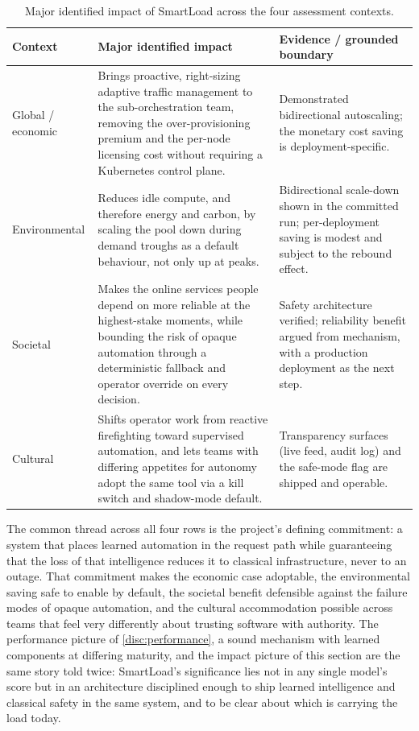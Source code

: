 \begin{table}[H]
  \centering
  \caption[Major identified impact across the four contexts]{Major identified impact of SmartLoad across the four assessment contexts.}
  \label{tab:disc:contexts}
  \small
  \begin{tabularx}{\linewidth}{@{}p{2.4cm}Yp{3.7cm}@{}}
    \toprule
    \headrow
    \textbf{Context} & \textbf{Major identified impact} & \textbf{Evidence / grounded boundary} \\
    \midrule
    Global / economic
      & Brings proactive, right-sizing adaptive traffic management to the
        sub-orchestration team, removing the over-provisioning premium and the
        per-node licensing cost without requiring a Kubernetes control plane.
      & Demonstrated bidirectional autoscaling; the monetary cost saving is
        deployment-specific. \\[2pt]
    Environmental
      & Reduces idle compute, and therefore energy and carbon, by scaling the
        pool down during demand troughs as a default behaviour, not only up at peaks.
      & Bidirectional scale-down shown in the committed run; per-deployment saving
        is modest and subject to the rebound effect. \\[2pt]
    Societal
      & Makes the online services people depend on more reliable at the highest-stake
        moments, while bounding the risk of opaque automation through a deterministic
        fallback and operator override on every decision.
      & Safety architecture verified; reliability benefit argued from mechanism, with
        a production deployment as the next step. \\[2pt]
    Cultural
      & Shifts operator work from reactive firefighting toward supervised automation,
        and lets teams with differing appetites for autonomy adopt the same tool via a
        kill switch and shadow-mode default.
      & Transparency surfaces (live feed, audit log) and the safe-mode flag are
        shipped and operable. \\
    \bottomrule
  \end{tabularx}
\end{table}

The common thread across all four rows is the project's defining commitment: a system
that places learned automation in the request path while guaranteeing that the loss of
that intelligence reduces it to classical infrastructure, never to an outage. That
commitment makes the economic case adoptable, the environmental saving safe to enable by
default, the societal benefit defensible against the failure modes of opaque automation,
and the cultural accommodation possible across teams that feel very differently about
trusting software with authority. The performance picture of \cref{disc:performance}, a
sound mechanism with learned components at differing maturity, and the impact picture of
this section are the same story told twice: SmartLoad's significance lies not in any
single model's score but in an architecture disciplined enough to ship learned
intelligence and classical safety in the same system, and to be clear about which is
carrying the load today.
